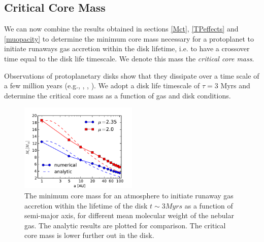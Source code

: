 \documentclass[apj]{emulateapj}
\begin{document}
\subsection{Critical Core Mass}
\label{critcore}

We can now combine the results obtained in sections \ref{Mct}, \ref{TPeffects} and \ref{muopacity} to determine the minimum core mass necessary for a protoplanet to initiate runaways gas accretion within the disk lifetime, i.e. to have a crossover time equal to the disk life timescale. We  denote this mass the \textit{critical core mass}.


Observations of protoplanetary disks show that they dissipate over a time scale of a few million years (e.g., \citealt{lagrange00}, \citealt{haisch01}, \citealt{goldreich04}). We adopt a disk life timescale of $\tau=3 $ Myrs and determine the critical core mass as a function of gas and disk conditions. 

\begin{figure}[h]
\centering
\includegraphics[width=0.5\textwidth]{../../figs/ModelAtmospheres/RadSelfGravPoly/PaperFigs/Mcrit_vs_a_3Myrs_new.pdf}
\caption{The minimum core mass for an atmosphere to initiate runaway gas accretion within the lifetime of the disk $t \sim 3 Myrs$ as a function of semi-major axis, for different mean molecular weight of the nebular gas. The analytic results are plotted for comparison. The critical core mass is lower further out in the disk.}
\label{fig:Mcvsa}
\end{figure}
\end{document}
